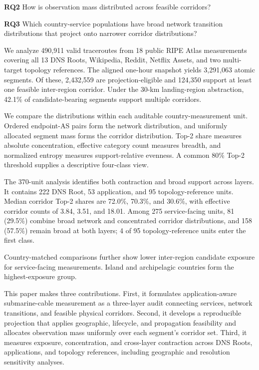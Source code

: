 \textbf{RQ2} How is observation mass distributed across feasible corridors?

\textbf{RQ3} Which country-service populations have broad network
transition distributions that project onto narrower corridor distributions?

We analyze 490,911 valid traceroutes from 18 public RIPE Atlas measurements
covering all 13 DNS Roots, Wikipedia, Reddit, Netflix Assets, and two
multi-target topology references. The aligned one-hour snapshot yields
3,291,063 atomic segments. Of these, 2,432,559 are projection-eligible and
124,350 support at least one feasible inter-region corridor. Under the 30-km
landing-region abstraction, 42.1\% of candidate-bearing segments support
multiple corridors.

We compare the distributions within each auditable country-measurement unit.
Ordered endpoint-AS pairs form the network distribution, and uniformly
allocated segment mass forms the corridor distribution. Top-2 share measures
absolute concentration, effective category count measures breadth, and
normalized entropy measures support-relative evenness. A common 80\% Top-2
threshold supplies a descriptive four-class view.

The 370-unit analysis identifies both contraction and broad support across
layers. It contains 222 DNS Root, 53 application, and 95 topology-reference
units. Median corridor Top-2 shares are 72.0\%, 70.3\%, and 30.6\%, with
effective corridor counts of 3.84, 3.51, and 18.01. Among 275 service-facing
units, 81 (29.5\%) combine broad network and concentrated corridor
distributions, and 158 (57.5\%) remain broad at both layers; 4 of 95
topology-reference units enter the first class.

Country-matched comparisons further show lower inter-region candidate
exposure for service-facing measurements. Island and archipelagic countries
form the highest-exposure group.

This paper makes three contributions. First, it formulates application-aware
submarine-cable measurement as a three-layer audit connecting services,
network transitions, and feasible physical corridors. Second, it develops a
reproducible projection that applies geographic, lifecycle, and propagation
feasibility and allocates observation mass uniformly over each segment's
corridor set. Third, it measures exposure, concentration, and cross-layer
contraction across DNS Roots, applications, and topology references,
including geographic and resolution sensitivity analyses.